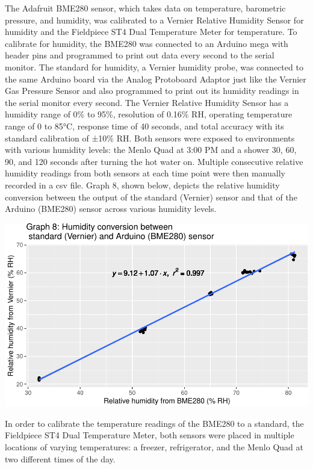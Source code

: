 \documentclass[12pt,]{article}
\begin{document}
The Adafruit BME280 sensor, which takes data on temperature, barometric
pressure, and humidity, was calibrated to a Vernier Relative Humidity
Sensor for humidity and the Fieldpiece ST4 Dual Temperature Meter for
temperature. To calibrate for humidity, the BME280 was connected to an
Arduino mega with header pins and programmed to print out data every
second to the serial monitor. The standard for humidity, a Vernier
humidity probe, was connected to the same Arduino board via the Analog
Protoboard Adaptor just like the Vernier Gas Pressure Sensor and also
programmed to print out its humidity readings in the serial monitor
every second. The Vernier Relative Humidity Sensor has a humidity range
of 0\% to 95\%, resolution of 0.16\% RH, operating temperature range of
0 to 85°C, response time of 40 seconds, and total accuracy with its
standard calibration of ±10\% RH. Both sensors were exposed to
environments with various humidity levels: the Menlo Quad at 3:00 PM and
a shower 30, 60, 90, and 120 seconds after turning the hot water on.
Multiple consecutive relative humidity readings from both sensors at
each time point were then manually recorded in a csv file. Graph 8,
shown below, depicts the relative humidity conversion between the output
of the standard (Vernier) sensor and that of the Arduino (BME280) sensor
across various humidity levels.

\includegraphics{paper_files/figure-latex/bme-1.pdf}

In order to calibrate the temperature readings of the BME280 to a
standard, the Fieldpiece ST4 Dual Temperature Meter, both sensors were
placed in multiple locations of varying temperatures: a freezer,
refrigerator, and the Menlo Quad at two different times of the day.
\end{document}
